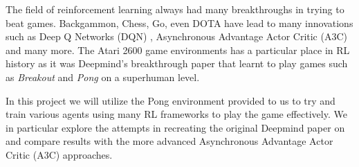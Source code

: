 The field of reinforcement learning always had many breakthroughs in trying to beat games. Backgammon, Chess, Go, even DOTA have lead to many innovations such as Deep Q Networks (DQN) \cite{Atari_Breakout}, Asynchronous Advantage Actor Critic (A3C) \cite{A3C} and many more.
The Atari 2600 game environments has a particular place in RL history as it was Deepmind's breakthrough paper that learnt to play games such as \textit{Breakout} and \textit{Pong} on a superhuman level.


\medskip 
\noindent
In this project we will utilize the Pong environment provided to us to try and train various agents using many RL frameworks to play the game effectively. We in particular explore the attempts in recreating the original Deepmind paper on and compare results with the more advanced Asynchronous Advantage Actor Critic (A3C) approaches.